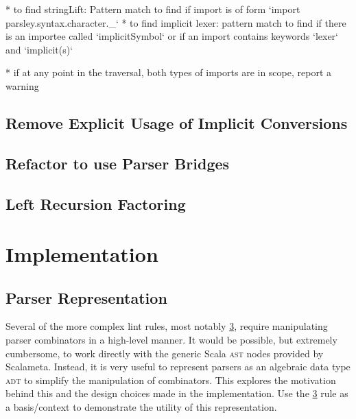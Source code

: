 \documentclass[../../main.tex]{subfiles}
\begin{document}
* to find stringLift: Pattern match to find if import is of form `import parsley.syntax.character.\_`
* to find implicit lexer: pattern match to find if there is an importee called `implicitSymbol` or if an import contains keywords `lexer` and `implicit(s)`

* if at any point in the traversal, both types of imports are in scope, report a warning

\section{Remove Explicit Usage of Implicit Conversions}

\section{Refactor to use Parser Bridges}

\section{Left Recursion Factoring}\label{sec:factor-leftrec}

\chapter{Implementation}


\section{Parser Representation}\label{sec:parser-representation}
Several of the more complex lint rules, most notably \cref{sec:factor-leftrec}, require manipulating parser combinators in a high-level manner.
It would be possible, but extremely cumbersome, to work directly with the generic Scala \textsc{ast} nodes provided by Scalameta.
Instead, it is very useful to represent parsers as an algebraic data type \textsc{adt} to simplify the manipulation of combinators.
This  explores the motivation behind this and the design choices made in the implementation.
Use the \cref{sec:factor-leftrec} rule as a basis/context to demonstrate the utility of this representation.
\end{document}
